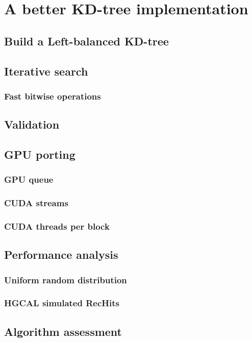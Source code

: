 \chapter{A better KD-tree implementation}\label{ch:fkdtree}

\section{Build a Left-balanced KD-tree}

\section{Iterative search}

\subsection{Fast bitwise operations}

\section{Validation}

\section{GPU porting}

\subsection{GPU queue}

\subsection{CUDA streams}

\subsection{CUDA threads per block}

\section{Performance analysis}

\subsection{Uniform random distribution}

\subsection{HGCAL simulated RecHits}

\section{Algorithm assessment}
